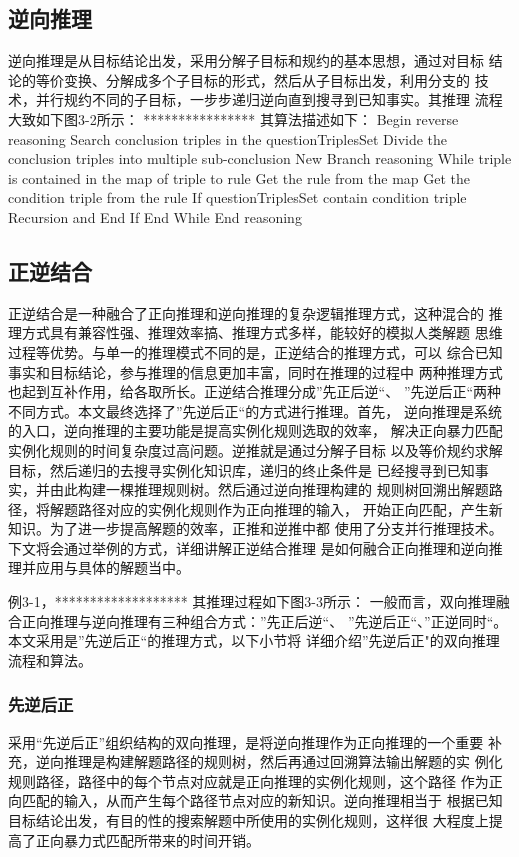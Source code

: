 \documentclass{standalone}
\begin{document}
\subsection{逆向推理}
逆向推理是从目标结论出发，采用分解子目标和规约的基本思想，通过对目标
结论的等价变换、分解成多个子目标的形式，然后从子目标出发，利用分支的
技术，并行规约不同的子目标，一步步递归逆向直到搜寻到已知事实。其推理
流程大致如下图3-2所示：
****************
其算法描述如下：
Begin reverse reasoning
	Search conclusion triples in the questionTriplesSet
		Divide the conclusion triples into multiple sub-conclusion
		New Branch reasoning
			While triple is contained in the map of triple to rule
			Get the rule from the map
				Get the condition triple from the rule 
					If questionTriplesSet contain condition triple
						Recursion and 
					End If 
			End While 
End reasoning  
\subsection{正逆结合}
正逆结合是一种融合了正向推理和逆向推理的复杂逻辑推理方式，这种混合的
推理方式具有兼容性强、推理效率搞、推理方式多样，能较好的模拟人类解题
思维过程等优势。与单一的推理模式不同的是，正逆结合的推理方式，可以
综合已知事实和目标结论，参与推理的信息更加丰富，同时在推理的过程中
两种推理方式也起到互补作用，给各取所长。正逆结合推理分成”先正后逆“、
”先逆后正“两种不同方式。本文最终选择了”先逆后正“的方式进行推理。首先，
逆向推理是系统的入口，逆向推理的主要功能是提高实例化规则选取的效率，
解决正向暴力匹配实例化规则的时间复杂度过高问题。逆推就是通过分解子目标
以及等价规约求解目标，然后递归的去搜寻实例化知识库，递归的终止条件是
已经搜寻到已知事实，并由此构建一棵推理规则树。然后通过逆向推理构建的
规则树回溯出解题路径，将解题路径对应的实例化规则作为正向推理的输入，
开始正向匹配，产生新知识。为了进一步提高解题的效率，正推和逆推中都
使用了分支并行推理技术。下文将会通过举例的方式，详细讲解正逆结合推理
是如何融合正向推理和逆向推理并应用与具体的解题当中。

例3-1，*******************
其推理过程如下图3-3所示：
一般而言，双向推理融合正向推理与逆向推理有三种组合方式：”先正后逆“、
”先逆后正“、”正逆同时“。本文采用是”先逆后正“的推理方式，以下小节将
详细介绍”先逆后正"的双向推理流程和算法。

\subsubsection{先逆后正}
采用“先逆后正”组织结构的双向推理，是将逆向推理作为正向推理的一个重要
补充，逆向推理是构建解题路径的规则树，然后再通过回溯算法输出解题的实
例化规则路径，路径中的每个节点对应就是正向推理的实例化规则，这个路径
作为正向匹配的输入，从而产生每个路径节点对应的新知识。逆向推理相当于
根据已知目标结论出发，有目的性的搜索解题中所使用的实例化规则，这样很
大程度上提高了正向暴力式匹配所带来的时间开销。
\end{document}
